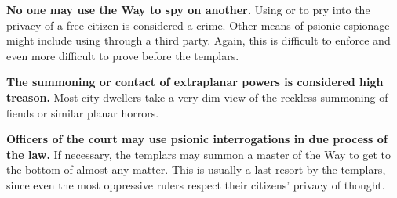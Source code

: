 \begin{itemize*}
\item \textbf{No one may use the Way to spy on another.} Using  or  to pry into the privacy of a free citizen is considered a crime. Other means of psionic espionage might include using  through a third party. Again, this is difficult to enforce and even more difficult to prove before the templars.

\item \textbf{The summoning or contact of extraplanar powers is considered high treason.} Most city-dwellers take a very dim view of the reckless summoning of fiends or similar planar horrors.

\item \textbf{Officers of the court may use psionic interrogations in due process of the law.} If necessary, the templars may summon a master of the Way to get to the bottom of almost any matter. This is usually a last resort by the templars, since even the most oppressive rulers respect their citizens' privacy of thought. 
\end{itemize*}



